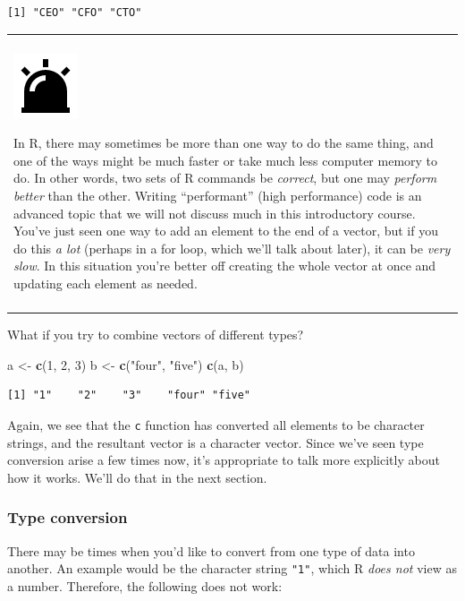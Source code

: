 \documentclass[
]{book}
\newenvironment{Shaded}{\begin{snugshade}}{\end{snugshade}}
\newcommand{\DecValTok}[1]{\textcolor[rgb]{0.00,0.00,0.81}{#1}}
\newcommand{\KeywordTok}[1]{\textcolor[rgb]{0.13,0.29,0.53}{\textbf{#1}}}
\newcommand{\NormalTok}[1]{#1}
\newcommand{\StringTok}[1]{\textcolor[rgb]{0.31,0.60,0.02}{#1}}
\newenvironment{caution}
{
  \begin{center}
  \begin{tabular}{|>{\columncolor{caution}}p{0.9\textwidth}|}
  \hline\\
  \includegraphics[scale=0.1]{src/images/alarm-warning-fill.png}
}
{\\\\\hline
  \end{tabular}
  \end{center}
}
\begin{document}
\begin{verbatim}
[1] "CEO" "CFO" "CTO"
\end{verbatim}

\begin{caution}
In R, there may sometimes be more than one way to do the same thing, and
one of the ways might be much faster or take much less computer memory
to do. In other words, two sets of R commands be \emph{correct}, but one
may \emph{perform better} than the other. Writing ``performant'' (high
performance) code is an advanced topic that we will not discuss much in
this introductory course. You've just seen one way to add an element to
the end of a vector, but if you do this \emph{a lot} (perhaps in a for
loop, which we'll talk about later), it can be \emph{very slow}. In this
situation you're better off creating the whole vector at once and
updating each element as needed.
\end{caution}

What if you try to combine vectors of different types?

\begin{Shaded}
\begin{Highlighting}[]
\NormalTok{a <-}\StringTok{ }\KeywordTok{c}\NormalTok{(}\DecValTok{1}\NormalTok{, }\DecValTok{2}\NormalTok{, }\DecValTok{3}\NormalTok{)}
\NormalTok{b <-}\StringTok{ }\KeywordTok{c}\NormalTok{(}\StringTok{"four"}\NormalTok{, }\StringTok{"five"}\NormalTok{)}
\KeywordTok{c}\NormalTok{(a, b)}
\end{Highlighting}
\end{Shaded}

\begin{verbatim}
[1] "1"    "2"    "3"    "four" "five"
\end{verbatim}

Again, we see that the \texttt{c} function has converted all elements to be character strings, and the resultant vector is a character vector.
Since we've seen type conversion arise a few times now, it's appropriate to talk more explicitly about how it works.
We'll do that in the next section.

\hypertarget{type-conversion}{%
\subsubsection{Type conversion}\label{type-conversion}}

There may be times when you'd like to convert from one type of data into another.
An example would be the character string \texttt{"1"}, which R \emph{does not} view as a number.
Therefore, the following does not work:
\end{document}
